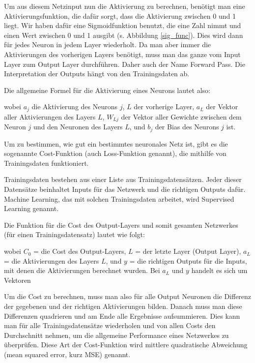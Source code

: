 \documentclass[10pt]{scrartcl}
\begin{document}
	Um aus diesem Netzinput nun die Aktivierung zu berechnen, benötigt man eine Aktivierungsfunktion, die dafür sorgt, dass die Aktivierung zwischen 0 und 1 liegt. Wir haben dafür eine Sigmoidfunktion benutzt, die eine Zahl nimmt und einen Wert zwischen 0 und 1 ausgibt (s. Abbildung \ref{sig_func}). Dies wird dann für jedes Neuron in jedem Layer wiederholt. Da man aber immer die Aktivierungen des vorherigen Layers benötigt, muss man das ganze vom Input Layer zum Output Layer durchführen. Daher auch der Name Forward Pass. Die Interpretation der Outputs hängt von den Trainingsdaten ab.

	{\newpage
	
	Die allgemeine Formel für die Aktivierung eines Neurons lautet also:}


	\form{
	\[
		\sig(x)=\frac{1}{1+e^{-x}}
		\]
	\[
		a_{j} = \sig\left(\sum_{L} (a_{L} * W_{Lj}) + b_{j}\right)
		\]}
	
	\noindent wobei $a_j$ die Aktivierung des Neurons $j$, $L$ der vorherige Layer, $a_L$ der Vektor aller Aktivierungen des Layers $L$, $W_{Lj}$ der Vektor aller Gewichte zwischen dem Neuron $j$ und den Neuronen des Layers $L$, und $b_j$ der Bias des Neurons $j$ ist. \cite{brotcrunsher:forwardpass}	
	

	Um zu bestimmen, wie gut ein bestimmtes neuronales Netz ist, gibt es die sogenannte Cost-Funktion (auch Loss-Funktion genannt), die mithilfe von Trainingsdaten funktioniert.
	
	Trainingsdaten bestehen aus einer Liste aus Trainingsdatensätzen. Jeder dieser Datensätze beinhaltet Inputs für das Netzwerk und die richtigen Outputs dafür. Machine Learning, das mit solchen Trainingsdaten arbeitet, wird Supervised Learning genannt.

	Die Funktion für die Cost des Output-Layers und somit gesamten Netzwerkes (für einen Trainingsdatensatz) lautet wie folgt:

	\form{ \[
		C_0 = (a_L - y)^2
	\]}


	\noindent wobei $C_0$ = die Cost des Output-Layers, $L$ = der letzte Layer (Output Layer), $a_L$ = die Aktivierungen des Layers $L$, und $y$ = die richtigen Outputs für die Inputs, mit denen die Aktivierungen berechnet wurden. 
	Bei $a_L$ und $y$ handelt es sich um Vektoren
	
	Um die Cost zu berechnen, muss man also für alle Output Neuronen die Differenz der gegebenen und der richtigen Aktivierungen bilden. Danach muss man diese Differenzen quadrieren und am Ende alle Ergebnisse aufsummieren. Dies kann man für alle Trainingsdatensätze wiederholen und von allen Costs den Durchschnitt nehmen, um die allgemeine Performance eines Netzwerkes zu überprüfen. Diese Art der Cost-Funktion wird mittlere quadratische Abweichung (mean squared error, kurz MSE) genannt. 
	
\end{document}
